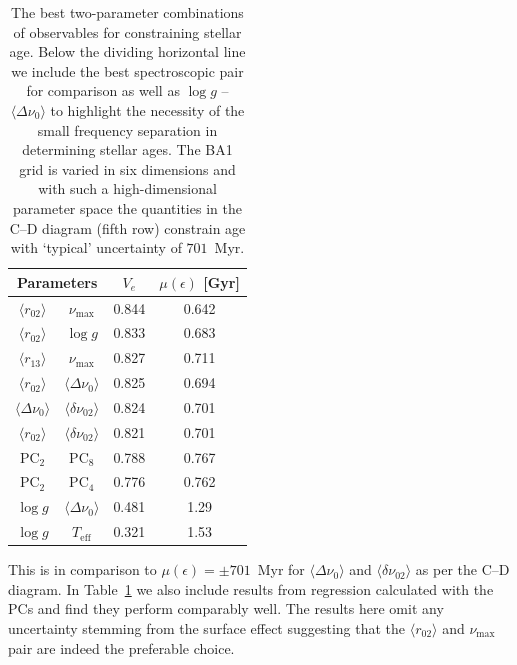 \begin{table}
\centering
\caption{The best two-parameter combinations of observables for constraining stellar age. Below the dividing horizontal line we include the best spectroscopic pair for comparison as well as ${\log{} g}$ -- ${\langle\Delta\nu_0\rangle}$ to highlight the necessity of the small frequency separation in determining stellar ages. The BA1 grid is varied in six dimensions and with such a high-dimensional parameter space the quantities in the C--D diagram (fifth row) constrain age with `typical' uncertainty of $701$~Myr.}
    \begin{tabular}{cccc}
    \hline \hline
\multicolumn{2}{c}{Parameters} & $V_e$ & $\mu (\epsilon)$ [Gyr] \\ \hline 
$\langle r_{02}\rangle$     & $\nu_{\max}$               &0.844  & 0.642\\
$\langle r_{02}\rangle$     & $\log{} g$                  &0.833  & 0.683\\
$\langle r_{13}\rangle$     &$\nu_{\max}$                &0.827  & 0.711\\
$\langle r_{02}\rangle$     & $\langle\Delta\nu_0\rangle$    &0.825  & 0.694\\
$\langle\Delta\nu_0\rangle$ &$\langle\delta\nu_{02}\rangle$  &0.824  & 0.701\\
$\langle r_{02}\rangle$     & $\langle\delta\nu_{02}\rangle$ &0.821  & 0.701\\
PC$_2$ & PC$_8$ & 0.788 & 0.767 \\
PC$_2$ & PC$_4$ & 0.776 & 0.762 \\
\hline
 $\log{} g$ & $\langle\Delta\nu_0\rangle$ & 0.481 & 1.29 \\
 $\log{} g$ & $T_{\text{eff}}$ & 0.321 & 1.53 \\
 \hline
    \end{tabular}
    \label{tab:cd}
\end{table}

This is in comparison to ${\mu (\epsilon) = \pm 701}$~Myr for ${\langle\Delta\nu_0\rangle}$ and ${\langle\delta\nu_{02}\rangle}$  as per the C--D diagram. 
In Table~\ref{tab:cd} we also include results from regression calculated with the PCs and find they perform comparably well. The results here omit any uncertainty stemming from the surface effect suggesting that the ${\langle r_{02}\rangle}$ and $\nu_{\max}$ pair are indeed the preferable choice. 



